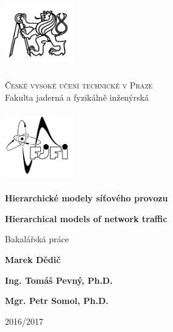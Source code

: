 \documentclass[a4paper,11pt]{book}
\begin{document}
\def\documentdate{7. července 2017}

\pagestyle{empty}
\begin{center}
	\begin{minipage}{3cm}
		\includegraphics[width=3cm,height=3cm,keepaspectratio]{images/titlepage/cvut}
	\end{minipage}
	\begin{minipage}{0.6\linewidth}
		\begin{center}
			\textsc{\large České vysoké učení technické v Praze}\\
			{\large Fakulta jaderná a fyzikálně inženýrská}
		\end{center}
	\end{minipage}
	\begin{minipage}{3cm}
		\includegraphics[width=3cm,height=3cm,keepaspectratio]{images/titlepage/fjfi}
	\end{minipage}

	\vspace{3.3cm}

	\textbf{\huge Hierarchické modely síťového provozu}
	\vspace{1.1cm}

	\textenglish{\textbf{\huge Hierarchical models of network traffic}}
	\vspace{1.7cm}

	{\large Bakalářská práce}
\end{center}

\vfill

\begin{list}{}{
	\settowidth{\labelwidth}{MMMMMMMMM}
	\setlength{\leftmargin}{\labelwidth}
	\renewcommand{\makelabel}[1]{#1\hfil}}
	\item [{Autor:}] \textbf{Marek Dědič}
	\item [{Vedoucí práce:}] \textbf{Ing. Tomáš Pevný, Ph.D.}
	\item [{Konzultant:}] \textbf{Mgr. Petr Somol, Ph.D.}
	\item [{Akademický rok:}] 2016/2017
\end{list}
\end{document}
